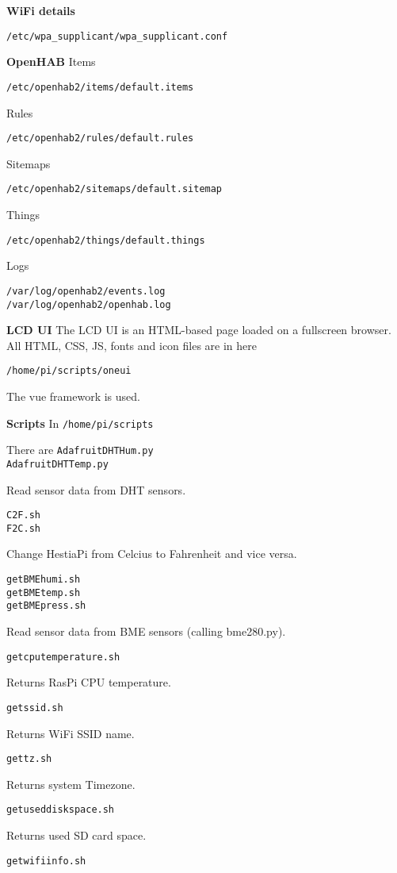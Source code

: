 \textbf{WiFi details}

\texttt{/etc/wpa\_supplicant/wpa\_supplicant.conf}

\textbf{OpenHAB}
Items

\texttt{/etc/openhab2/items/default.items}

Rules

\texttt{/etc/openhab2/rules/default.rules}

Sitemaps

\texttt{/etc/openhab2/sitemaps/default.sitemap}

Things

\texttt{/etc/openhab2/things/default.things}

Logs

\texttt{/var/log/openhab2/events.log\\
/var/log/openhab2/openhab.log}

\textbf{LCD UI}
The LCD UI is an HTML-based page loaded on a fullscreen browser. All HTML, CSS, JS, fonts and icon files are in here

\texttt{/home/pi/scripts/oneui}

The vue framework is used.
    
\textbf{Scripts}
In 
\texttt{/home/pi/scripts}

There are
\texttt{AdafruitDHTHum.py\\
AdafruitDHTTemp.py}

Read sensor data from DHT sensors.

\texttt{C2F.sh\\
F2C.sh}

Change HestiaPi from Celcius to Fahrenheit and vice versa.

\texttt{getBMEhumi.sh\\
getBMEtemp.sh\\
getBMEpress.sh}

Read sensor data from BME sensors (calling bme280.py).

\texttt{getcputemperature.sh}

Returns RasPi CPU temperature.

\texttt{getssid.sh}

Returns WiFi SSID name.

\texttt{gettz.sh}

Returns system Timezone.

\texttt{getuseddiskspace.sh}

Returns used SD card space.

\texttt{getwifiinfo.sh }


